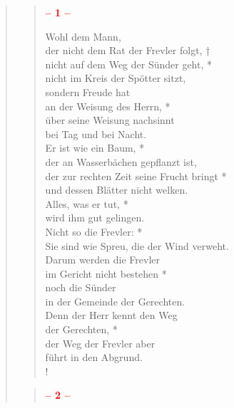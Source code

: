 \thispagestyle{plain}


\begin{quote}
\begin{verse}

\begin{center}
 \textcolor{red}{\normalsize\bf – 1 –}\\
\end{center}

\smallskip

Wohl dem Mann,\\
der nicht dem Rat der Frevler folgt, †\\
nicht auf dem Weg der Sünder geht, *\\
nicht im Kreis der Spötter sitzt,\\
\vin sondern Freude hat\\
\vin an der Weisung des Herrn, *\\
\vin über seine Weisung nachsinnt\\
\vin bei Tag und bei Nacht.\\
Er ist wie ein Baum, *\\
der an Wasserbächen gepflanzt ist, \\
\vin der zur rechten Zeit seine Frucht bringt *\\
\vin und dessen Blätter nicht welken.\\
Alles, was er tut, *\\
wird ihm gut gelingen.\\
\vin Nicht so die Frevler: *\\
\vin Sie sind wie Spreu, die der Wind verweht.\\
Darum werden die Frevler\\
im Gericht nicht bestehen *\\
noch die Sünder\\
in der Gemeinde der Gerechten.\\
\vin Denn der Herr kennt den Weg\\
\vin der Gerechten, *\\
\vin der Weg der Frevler aber\\
\vin führt in den Abgrund.\\!

\end{verse}

\begin{verse}

\begin{center}
 \textcolor{red}{\normalsize\bf – 2 –}\\
\end{center}


\end{verse}
\end{quote}
